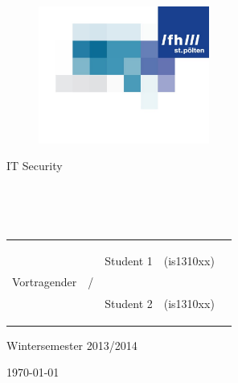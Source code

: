 \documentclass{scrartcl}
\title{\fhtitel}
\subtitle{\fhStudienbeschreibung}
\author{\fhautoren}
\date{\today}
\newcommand{\fhUeNummer}{1}
\newcommand{\fhBeschreibung}{Uebungstitel}
\newcommand{\fhStudiengang}{BIS-VZ}
\newcommand{\fhFach}{ENVS}
\newcommand{\fhVortragender}{\begin{Large}Vortragender\end{Large}}
\newcommand{\fhTitel}{UE~\fhUeNummer~-~\fhBeschreibung}
\newcommand{\fhUntertitel}{\fhFach~\fhStudiengang}
\begin{document}
\begin{titlepage}


\begin{figure}[h]
    \hspace{9.1cm}
    \includegraphics[width=0.5\textwidth]{fh_logo}   
\end{figure}

\vspace{-4.2cm}
\begin{huge}{\color{fhColor} IT Security}\end{huge}
\vspace{6cm}

\begin{flushright}

\textbf{\Huge \color{fhColor}{\fhTitel}}\\

\vspace{0.5cm}

\begin{huge} \color{fhColor}{\fhUntertitel}\end{huge}\\

\vspace{4cm}

\begin{tabular}{lllll}
\multirow{2}{*}{\fhVortragender} & \multirow{2}{*}{\begin{Large}/\end{Large}} & \begin{LARGE}Student 1\end{LARGE} & \small{(is1310xx)}\\
& & \begin{LARGE}Student 2\end{LARGE} & {(is1310xx)}
\end{tabular}

\vspace{2cm}

\begin{Large} Wintersemester 2013/2014\end{Large}

\vspace{5cm}

\today
\end{flushright}
\end{titlepage}
\end{document}
